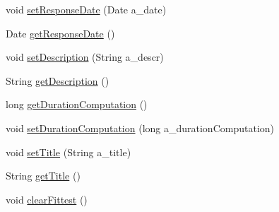 \begin{DoxyCompactItemize}
\item 
void \hyperlink{classorg_1_1jgap_1_1distr_1_1grid_1_1gp_1_1_j_g_a_p_result_g_p_ac81114389359ee8f9e4995b59fcbbd49}{set\-Response\-Date} (Date a\-\_\-date)
\item 
Date \hyperlink{classorg_1_1jgap_1_1distr_1_1grid_1_1gp_1_1_j_g_a_p_result_g_p_aa388ab62c4e3f9e329f8c5ac90cb3c25}{get\-Response\-Date} ()
\item 
void \hyperlink{classorg_1_1jgap_1_1distr_1_1grid_1_1gp_1_1_j_g_a_p_result_g_p_af886f34c36968f5d1b5d7fdf0636ff7c}{set\-Description} (String a\-\_\-descr)
\item 
String \hyperlink{classorg_1_1jgap_1_1distr_1_1grid_1_1gp_1_1_j_g_a_p_result_g_p_a5b6ed3cd2ab2f5159e8bb369e67c344a}{get\-Description} ()
\item 
long \hyperlink{classorg_1_1jgap_1_1distr_1_1grid_1_1gp_1_1_j_g_a_p_result_g_p_abea49c4161060254a0195b5fe3fa6719}{get\-Duration\-Computation} ()
\item 
void \hyperlink{classorg_1_1jgap_1_1distr_1_1grid_1_1gp_1_1_j_g_a_p_result_g_p_aa68cd1682909060d4f5d745522f76b70}{set\-Duration\-Computation} (long a\-\_\-duration\-Computation)
\item 
void \hyperlink{classorg_1_1jgap_1_1distr_1_1grid_1_1gp_1_1_j_g_a_p_result_g_p_a7eab37d427b7ffe9251e0c8e5aa243f3}{set\-Title} (String a\-\_\-title)
\item 
String \hyperlink{classorg_1_1jgap_1_1distr_1_1grid_1_1gp_1_1_j_g_a_p_result_g_p_a4da5946d13369008818a16519496f127}{get\-Title} ()
\item 
void \hyperlink{classorg_1_1jgap_1_1distr_1_1grid_1_1gp_1_1_j_g_a_p_result_g_p_a3fbbd66403b7c7aa6c29791a3067e5db}{clear\-Fittest} ()
\end{DoxyCompactItemize}
